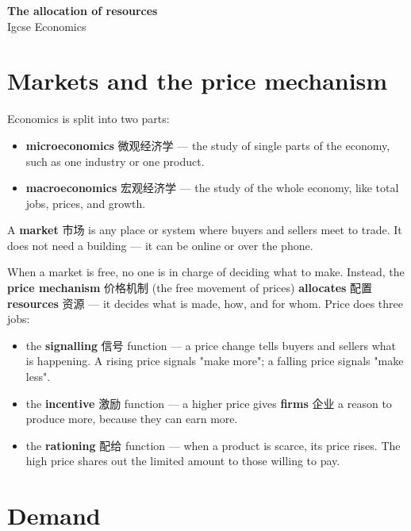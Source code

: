 \documentclass[11pt]{article}
\begin{document}
\begin{center}
  {\LARGE\bfseries The allocation of resources}\\[0.35em]
  {\large Igcse Economics}
\end{center}
\vspace{0.6em}

\section*{Markets and the price mechanism}

Economics is split into two parts:

\begin{itemize}
\item \textbf{microeconomics} 微观经济学 — the study of single parts of the economy, such as one industry or one product.

\item \textbf{macroeconomics} 宏观经济学 — the study of the whole economy, like total jobs, prices, and growth.

\end{itemize}

A \textbf{market} 市场 is any place or system where buyers and sellers meet to trade. It does not need a building — it can be online or over the phone.

When a market is free, no one is in charge of deciding what to make. Instead, the \textbf{price mechanism} 价格机制 (the free movement of prices) \textbf{allocates} 配置 \textbf{resources} 资源 — it decides what is made, how, and for whom. Price does three jobs:

\begin{itemize}
\item the \textbf{signalling} 信号 function — a price change tells buyers and sellers what is happening. A rising price signals "make more"; a falling price signals "make less".

\item the \textbf{incentive} 激励 function — a higher price gives \textbf{firms} 企业 a reason to produce more, because they can earn more.

\item the \textbf{rationing} 配给 function — when a product is scarce, its price rises. The high price shares out the limited amount to those willing to pay.

\end{itemize}

\section*{Demand}
\end{document}
